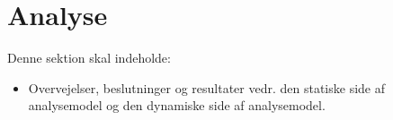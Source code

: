 \section{Analyse}
Denne sektion skal indeholde:

\begin{itemize}
    \item Overvejelser, beslutninger og resultater vedr. den statiske side af analysemodel og den dynamiske side af analysemodel. 
\end{itemize}{}


\newpage


\newpages